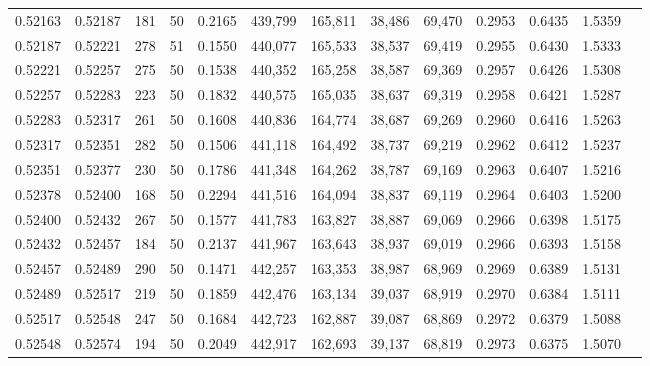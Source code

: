 \begin{tabular}{rrrrrrrrrrrrr}
0.52163 & 0.52187 &   181 &  50 &                                     0.2165 & 439,799 & 165,811 &  38,486 &  69,470 & 0.2953 & 0.6435 & 1.5359 \\
0.52187 & 0.52221 &   278 &  51 &                                     0.1550 & 440,077 & 165,533 &  38,537 &  69,419 & 0.2955 & 0.6430 & 1.5333 \\
0.52221 & 0.52257 &   275 &  50 &                                     0.1538 & 440,352 & 165,258 &  38,587 &  69,369 & 0.2957 & 0.6426 & 1.5308 \\
0.52257 & 0.52283 &   223 &  50 &                                     0.1832 & 440,575 & 165,035 &  38,637 &  69,319 & 0.2958 & 0.6421 & 1.5287 \\
0.52283 & 0.52317 &   261 &  50 &                                     0.1608 & 440,836 & 164,774 &  38,687 &  69,269 & 0.2960 & 0.6416 & 1.5263 \\
0.52317 & 0.52351 &   282 &  50 &                                     0.1506 & 441,118 & 164,492 &  38,737 &  69,219 & 0.2962 & 0.6412 & 1.5237 \\
0.52351 & 0.52377 &   230 &  50 &                                     0.1786 & 441,348 & 164,262 &  38,787 &  69,169 & 0.2963 & 0.6407 & 1.5216 \\
0.52378 & 0.52400 &   168 &  50 &                                     0.2294 & 441,516 & 164,094 &  38,837 &  69,119 & 0.2964 & 0.6403 & 1.5200 \\
0.52400 & 0.52432 &   267 &  50 &                                     0.1577 & 441,783 & 163,827 &  38,887 &  69,069 & 0.2966 & 0.6398 & 1.5175 \\
0.52432 & 0.52457 &   184 &  50 &                                     0.2137 & 441,967 & 163,643 &  38,937 &  69,019 & 0.2966 & 0.6393 & 1.5158 \\
0.52457 & 0.52489 &   290 &  50 &                                     0.1471 & 442,257 & 163,353 &  38,987 &  68,969 & 0.2969 & 0.6389 & 1.5131 \\
0.52489 & 0.52517 &   219 &  50 &                                     0.1859 & 442,476 & 163,134 &  39,037 &  68,919 & 0.2970 & 0.6384 & 1.5111 \\
0.52517 & 0.52548 &   247 &  50 &                                     0.1684 & 442,723 & 162,887 &  39,087 &  68,869 & 0.2972 & 0.6379 & 1.5088 \\
0.52548 & 0.52574 &   194 &  50 &                                     0.2049 & 442,917 & 162,693 &  39,137 &  68,819 & 0.2973 & 0.6375 & 1.5070 \\

\end{tabular}
